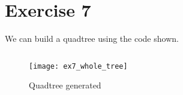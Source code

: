 \section*{Exercise 7}

We can build a quadtree using the code shown.

\inputminted{Python}{../ex7.py}

\begin{figure}[h]
  \centering
  \texttt{[image: ex7\_whole\_tree]}
  \caption{Quadtree generated}
\end{figure}

\inputminted{text}{../output/ex7.txt}
